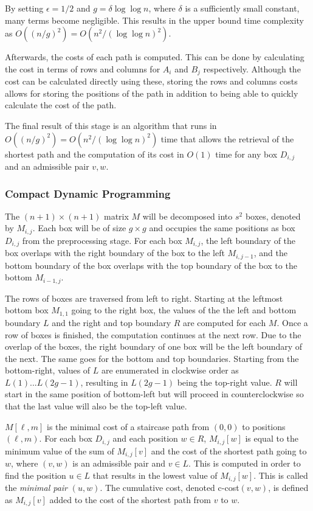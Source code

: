By setting $\epsilon=1/2$ and $g=\delta \log\log n$, where $\delta$ is a sufficiently small constant, many terms become negligible. This results in the upper bound time complexity as $O((n/g)^2) = O(n^2/(\log\log n)^2)$.

Afterwards, the costs of each path is computed. This can be done by calculating the cost in terms of rows and columns for $A_i$ and $B_j$ respectively. Although the cost can be calculated directly using these, storing the rows and columns costs allows for storing the positions of the path in addition to being able to quickly calculate the cost of the path.

The final result of this stage is an algorithm that runs in $O((n/g)^2) = O(n^2/(\log\log n)^2)$ time that allows the retrieval of the shortest path and the computation of its cost in $O(1)$ time for any box $D_{i,j}$ and an admissible pair $v,w$.

\subsubsection{Compact Dynamic Programming}
The $(n+1) \times (n+1)$ matrix $M$ will be decomposed into $s^2$ boxes, denoted by $M_{i,j}$. Each box will be of size $g \times g$ and occupies the same positions as box $D_{i,j}$ from the preprocessing stage. For each box $M_{i,j}$, the left boundary of the box overlaps with the right boundary of the box to the left $M_{i,j-1}$, and the bottom boundary of the box overlaps with the top boundary of the box to the bottom $M_{i-1,j}$.

The rows of boxes are traversed from left to right. Starting at the leftmost bottom box $M_{1,1}$ going to the right box, the values of the the left and bottom boundary $L$ and the right and top boundary $R$ are computed for each $M$. Once a row of boxes is finished, the computation continues at the next row. Due to the overlap of the boxes, the right boundary of one box will be the left boundary of the next. The same goes for the bottom and top boundaries. Starting from the bottom-right, values of $L$ are enumerated in clockwise order as $L(1)...L(2g-1)$, resulting in $L(2g-1)$ being the top-right value. $R$ will start in the same position of bottom-left but will proceed in counterclockwise so that the last value will also be the top-left value.

$M[\ell,m]$ is the minimal cost of a staircase path from $(0,0)$ to positions $(\ell, m)$. For each box $D_{i,j}$ and each position $w \in R$, $M_{i,j}[w]$ is equal to the minimum value of the sum of $M_{i,j}[v]$ and the cost of the shortest path going to $w$, where $(v,w)$ is an admissible pair and $v \in L$. This is computed in order to find the position $u \in L$ that results in the lowest value of $M_{i,j}[w]$. This is called the \textit{minimal pair} $(u,w)$. The cumulative cost, denoted c-cost$(v,w)$, is defined as $M_{i,j}[v]$ added to the cost of the shortest path from $v$ to $w$.

